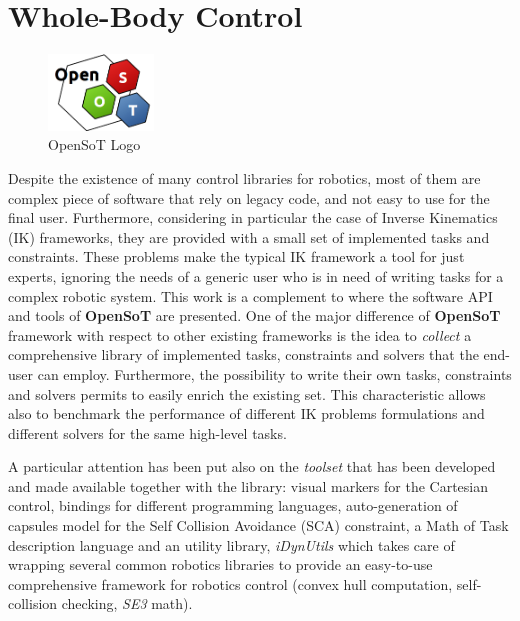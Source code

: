 \section{Whole-Body Control}
\begin{figure}
  \begin{center}
    \includegraphics[width=0.25\textwidth]{images/openSoT_stickers}
  \end{center}
  \caption{OpenSoT Logo}
\end{figure}
Despite the existence of many control libraries for robotics, most of them are complex piece of software that rely on legacy code, and not easy to use for the final user. Furthermore, considering in particular the case of Inverse Kinematics (IK) frameworks, they are provided with a small set of implemented tasks and constraints. These problems make the typical IK framework a tool for just experts, ignoring the needs of a generic user who is in need of writing tasks for a complex robotic system. This work is a complement to \cite{rocchimingo:16} where the software API and tools of \textbf{OpenSoT} are presented. One of the major difference of \textbf{OpenSoT} framework with respect to other existing frameworks is the idea to \emph{collect} a comprehensive library of implemented tasks, constraints and solvers that the end-user can employ. Furthermore, the possibility to write their own tasks, constraints and solvers permits to easily enrich the existing set. This characteristic allows also to benchmark the performance of different IK problems formulations and different solvers for the same high-level tasks. 

A particular attention has been put also on the \emph{toolset} that has been developed and made available together with the library: visual markers for the Cartesian control, bindings for different programming languages, auto-generation of capsules model for the Self Collision Avoidance (SCA) constraint, a Math of Task description language and an utility library, \emph{iDynUtils} which takes care of wrapping several common robotics libraries to provide an easy-to-use comprehensive framework for robotics control (convex hull computation, self-collision checking, \emph{SE3} math). 

